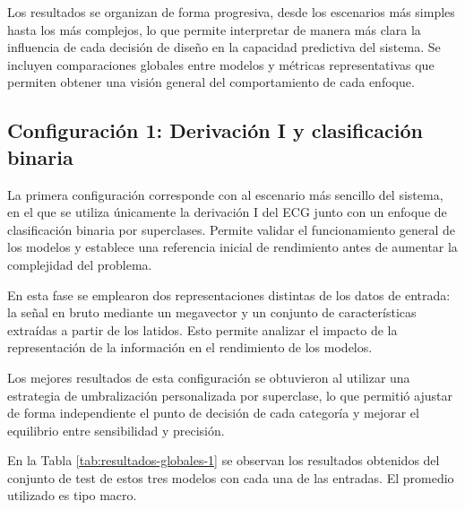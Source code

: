 \documentclass[12pt,a4paper,twoside]{book}
\begin{document}
Los resultados se organizan de forma progresiva, desde los escenarios más simples hasta los más complejos, lo que permite interpretar de manera más clara la influencia de cada decisión de diseño en la capacidad predictiva del sistema.
Se incluyen comparaciones globales entre modelos y métricas representativas que permiten obtener una visión general del comportamiento de cada enfoque.


\subsection{Configuración 1: Derivación I y clasificación binaria}

La primera configuración corresponde con al escenario más sencillo del sistema, en el que se utiliza únicamente la derivación I del ECG junto con un enfoque de clasificación binaria por superclases.
Permite validar el funcionamiento general de los modelos y establece una referencia inicial de rendimiento antes de aumentar la complejidad del problema.

En esta fase se emplearon dos representaciones distintas de los datos de entrada: la señal en bruto mediante un megavector y un conjunto de características extraídas a partir de los latidos.
Esto permite analizar el impacto de la representación de la información en el rendimiento de los modelos.

Los mejores resultados de esta configuración se obtuvieron al utilizar una estrategia de umbralización personalizada por superclase, lo que permitió ajustar de forma independiente el punto de decisión de cada categoría y mejorar el equilibrio entre sensibilidad y precisión.

En la Tabla \ref{tab:resultados-globales-1} se observan los resultados obtenidos del conjunto de test de estos tres modelos con cada una de las entradas. El promedio utilizado es tipo macro.
\end{document}
